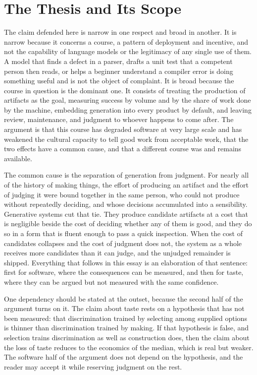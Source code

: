 \documentclass[11pt,a4paper]{article}
\theoremstyle{remark}
\begin{document}
\section{The Thesis and Its Scope}

The claim defended here is narrow in one respect and broad in another. It is narrow because it concerns a course, a pattern of deployment and incentive, and not the capability of language models or the legitimacy of any single use of them. A model that finds a defect in a parser, drafts a unit test that a competent person then reads, or helps a beginner understand a compiler error is doing something useful and is not the object of complaint. It is broad because the course in question is the dominant one. It consists of treating the production of artifacts as the goal, measuring success by volume and by the share of work done by the machine, embedding generation into every product by default, and leaving review, maintenance, and judgment to whoever happens to come after. The argument is that this course has degraded software at very large scale and has weakened the cultural capacity to tell good work from acceptable work, that the two effects have a common cause, and that a different course was and remains available.

The common cause is the separation of generation from judgment. For nearly all of the history of making things, the effort of producing an artifact and the effort of judging it were bound together in the same person, who could not produce without repeatedly deciding, and whose decisions accumulated into a sensibility. Generative systems cut that tie. They produce candidate artifacts at a cost that is negligible beside the cost of deciding whether any of them is good, and they do so in a form that is fluent enough to pass a quick inspection. When the cost of candidates collapses and the cost of judgment does not, the system as a whole receives more candidates than it can judge, and the unjudged remainder is shipped. Everything that follows in this essay is an elaboration of that sentence: first for software, where the consequences can be measured, and then for taste, where they can be argued but not measured with the same confidence.

One dependency should be stated at the outset, because the second half of the argument turns on it. The claim about taste rests on a hypothesis that has not been measured: that discrimination trained by selecting among supplied options is thinner than discrimination trained by making. If that hypothesis is false, and selection trains discrimination as well as construction does, then the claim about the loss of taste reduces to the economics of the median, which is real but weaker. The software half of the argument does not depend on the hypothesis, and the reader may accept it while reserving judgment on the rest.
\end{document}
